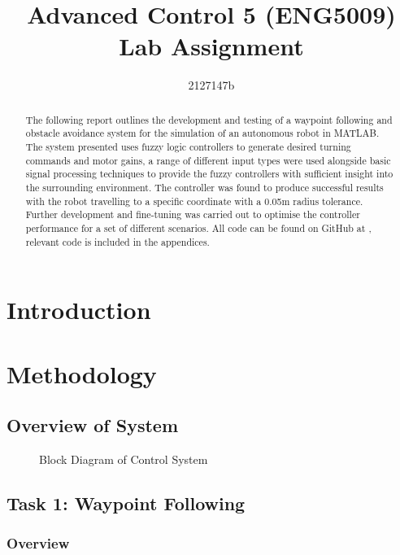 \documentclass[11pt]{article}
\begin{document}
\title{Advanced Control 5 (ENG5009) \\ \large{Lab Assignment}}
\author{2127147b}
\maketitle

\begin{abstract}
    The following report outlines the development and testing of a waypoint following and obstacle avoidance system for the simulation of an autonomous robot in MATLAB.
    The system presented uses fuzzy logic controllers to generate desired turning commands and motor gains, a range of different input types were used alongside basic signal processing techniques to provide the fuzzy controllers with sufficient insight into the surrounding environment.
    The controller was found to produce successful results with the robot travelling to a specific coordinate with a 0.05m radius tolerance. 
    Further development and fine-tuning was carried out to optimise the controller performance for a set of different scenarios.
    All code can be found on GitHub at \cite{github}, relevant code is included in the appendices.  
    \end{abstract}

\section{Introduction}

\section{Methodology}
\subsection{Overview of System}

\begin{figure}[H]
    \centering
    \caption{Block Diagram of Control System}
    \label{fig:system}
\end{figure}


\pagebreak
\subsection{Task 1: Waypoint Following}
\subsubsection{Overview}
\end{document}
